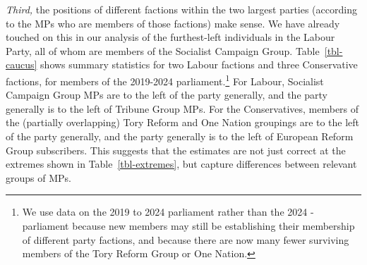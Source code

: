 \documentclass[
]{article}
\begin{document}
\begin{table}

\caption{\label{tbl-caucus}Average positions and standard deviations of
MPs in different party caucuses, 2019 to 2024 parliament.}


\end{table}%

\emph{Third,} the positions of different factions within the two largest
parties (according to the MPs who are members of those factions) make
sense. We have already touched on this in our analysis of the
furthest-left individuals in the Labour Party, all of whom are members
of the Socialist Campaign Group. Table~\ref{tbl-caucus} shows summary
statistics for two Labour factions and three Conservative factions, for
members of the 2019-2024 parliament.\footnote{We use data on the 2019 to
  2024 parliament rather than the 2024 - parliament because new members
  may still be establishing their membership of different party
  factions, and because there are now many fewer surviving members of
  the Tory Reform Group or One Nation.} For Labour, Socialist Campaign
Group MPs are to the left of the party generally, and the party
generally is to the left of Tribune Group MPs. For the Conservatives,
members of the (partially overlapping) Tory Reform and One Nation
groupings are to the left of the party generally, and the party
generally is to the left of European Reform Group subscribers. This
suggests that the estimates are not just correct at the extremes shown
in Table~\ref{tbl-extremes}, but capture differences between relevant
groups of MPs.
\end{document}
